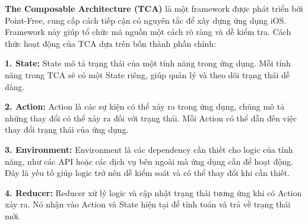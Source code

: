 \textbf{The Composable Architecture (TCA)} là một framework được phát triển bởi Point-Free, cung cấp cách tiếp cận có nguyên tắc để xây dựng ứng dụng iOS. Framework này giúp tổ chức mã nguồn một cách rõ ràng và dễ kiểm tra. Cách thức hoạt động của TCA dựa trên bốn thành phần chính:

\vspace{0.5em}

\textbf{1. State:} State mô tả trạng thái của một tính năng trong ứng dụng. Mỗi tính năng trong TCA sẽ có một State riêng, giúp quản lý và theo dõi trạng thái dễ dàng.

\vspace{0.5em}

\textbf{2. Action:} Action là các sự kiện có thể xảy ra trong ứng dụng, chúng mô tả những thay đổi có thể xảy ra đối với trạng thái. Mỗi Action có thể dẫn đến việc thay đổi trạng thái của ứng dụng.

\vspace{0.5em}

\textbf{3. Environment:} Environment là các dependency cần thiết cho logic của tính năng, như các API hoặc các dịch vụ bên ngoài mà ứng dụng cần để hoạt động. Đây là yếu tố giúp logic trở nên dễ kiểm soát và có thể thay đổi khi cần thiết.

\vspace{0.5em}

\textbf{4. Reducer:} Reducer xử lý logic và cập nhật trạng thái tương ứng khi có Action xảy ra. Nó nhận vào Action và State hiện tại để tính toán và trả về trạng thái mới.

